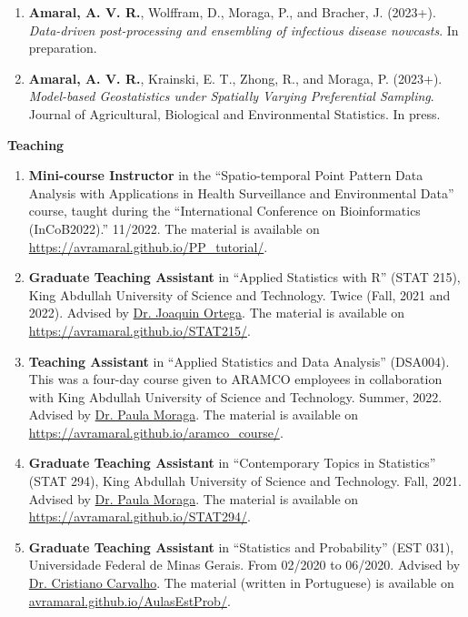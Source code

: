 \documentclass[11pt, ]{article}
\begin{document}
	\begin{enumerate}
		\item \textbf{Amaral, A. V. R.}, Wolffram, D., Moraga, P., and Bracher, J. (2023+). \textit{Data-driven post-processing and ensembling of infectious disease nowcasts}. In preparation.
		\item  \textbf{Amaral, A. V. R.}, Krainski, E. T., Zhong, R., and Moraga, P. (2023+). \textit{Model-based Geostatistics under Spatially Varying Preferential Sampling}.  Journal of Agricultural, Biological and Environmental Statistics. In press.
	\end{enumerate}
	
	\vspace{6pt}
	
	{\Large \textbf{Teaching}}
	
	\begin{enumerate}
		\item \textbf{Mini-course Instructor} in the ``Spatio-temporal Point Pattern Data Analysis with Applications in Health Surveillance and Environmental Data'' course, taught during the ``International Conference on Bioinformatics (InCoB2022).'' 11/2022. The material is available on  \href{https://avramaral.github.io/PP_tutorial/}{\url{https://avramaral.github.io/PP_tutorial/}}.
		
		\item \textbf{Graduate Teaching Assistant} in ``Applied Statistics with R'' (STAT 215), King Abdullah University of Science and Technology. Twice (Fall, 2021 and 2022). Advised by \href{https://cemse.kaust.edu.sa/people/person/joaquin-ortega-sanchez}{Dr. Joaquin Ortega}. The material is available on \href{https://avramaral.github.io/STAT215/}{\url{https://avramaral.github.io/STAT215/}}.
		
		\item \textbf{Teaching Assistant} in ``Applied Statistics and Data Analysis'' (DSA004). This was a four-day course given to ARAMCO employees in collaboration with King Abdullah University of Science and Technology. Summer, 2022. Advised by \href{https://www.paulamoraga.com/}{Dr. Paula Moraga}. The material is available on \href{https://avramaral.github.io/aramco\_course/}{\url{https://avramaral.github.io/aramco\_course/}}.
		
		\item \textbf{Graduate Teaching Assistant} in ``Contemporary Topics in Statistics'' (STAT 294), King Abdullah University of Science and Technology. Fall, 2021. Advised by \href{https://www.paulamoraga.com/}{Dr. Paula Moraga}. The material is available on \href{https://avramaral.github.io/STAT294/}{\url{https://avramaral.github.io/STAT294/}}.
		
		\item \textbf{Graduate Teaching Assistant} in ``Statistics and Probability'' (EST 031), Universidade Federal de Minas Gerais. From 02/2020 to 06/2020. Advised by \href{http://www.est.ufmg.br/~cristianocs/}{Dr. Cristiano Carvalho}. The material (written in Portuguese) is available on \href{https://avramaral.github.io/AulasEstProb/}{\url{avramaral.github.io/AulasEstProb/}}.
	\end{enumerate}
	
\end{document}
